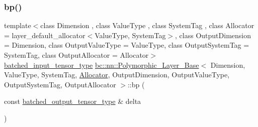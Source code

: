 \subsubsection{\texorpdfstring{bp()}{bp()}\hspace{0.1cm}{\footnotesize\ttfamily [1/2]}}
{\footnotesize\ttfamily template$<$class Dimension , class Value\+Type , class System\+Tag , class Allocator  = layer\+\_\+default\+\_\+allocator$<$\+Value\+Type, System\+Tag$>$, class Output\+Dimension  = Dimension, class Output\+Value\+Type  = Value\+Type, class Output\+System\+Tag  = System\+Tag, class Output\+Allocator  = Allocator$>$ \\
\hyperlink{structbc_1_1nn_1_1Polymorphic__Layer__Base_ae694b03dd73923ff973b0d2c9156e161}{batched\+\_\+input\+\_\+tensor\+\_\+type} \hyperlink{structbc_1_1nn_1_1Polymorphic__Layer__Base}{bc\+::nn\+::\+Polymorphic\+\_\+\+Layer\+\_\+\+Base}$<$ Dimension, Value\+Type, System\+Tag, \hyperlink{classbc_1_1allocators_1_1Allocator}{Allocator}, Output\+Dimension, Output\+Value\+Type, Output\+System\+Tag, Output\+Allocator $>$\+::bp (\begin{DoxyParamCaption}\item[{const \hyperlink{structbc_1_1nn_1_1Polymorphic__Layer__Base_a45ed57549be9c4e5c40c52168ca15ae9}{batched\+\_\+output\+\_\+tensor\+\_\+type} \&}]{delta }\end{DoxyParamCaption})\hspace{0.3cm}{\ttfamily [inline]}}

\mbox{\label{structbc_1_1nn_1_1Polymorphic__Layer__Base_a317faf7f621b09947ac22385d26e61e4}} 
